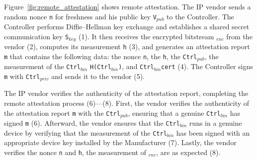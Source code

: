 Figure~\ref{fig:remote_attestation} shows \projecttitle{} remote attestation. The IP vendor sends a random nonce \texttt{n} for freshness and his public key \texttt{V}$_{pub}$ to the Controller. The Controller performs Diffie–Hellman key exchange and establishes a shared secret communication key \texttt{S$_{key}$} (1).
It then receives the encrypted bitstream \projecttitle{}$_{enc}$ from the vendor (2),  computes its measurement \texttt{h} (3), and generates an attestation report \texttt{m} that contains the following data: the nonce \texttt{n}, the \texttt{h}, the \texttt{Ctrl$_{pub}$}, the measurement of the \texttt{Ctrl$_{bin}$} \texttt{H(Ctrl$_{bin}$)}, and \texttt{Ctrl$_{bin}$cert} (4). The Controller signs \texttt{m} with \texttt{Ctrl$_{priv}$} and sends it to the vendor (5).

The IP vendor verifies the authenticity of the attestation report, completing the remote attestation process (6)---(8). First, the vendor verifies the authenticity of the attestation report \texttt{m} with the \texttt{Ctrl$_{pub}$}, ensuring that a genuine \texttt{Ctrl$_{bin}$} has signed \texttt{m} (6). Afterward, the vendor ensures that the \texttt{Ctrl$_{bin}$} runs in a genuine \projecttitle{} device by verifying that the measurement of the \texttt{Ctrl$_{bin}$} has been signed with an appropriate device key installed by the Manufacturer (7). Lastly, the vendor verifies the nonce \texttt{n} and \texttt{h}, the measurement of \projecttitle{}$_{enc}$, are as expected (8). 

